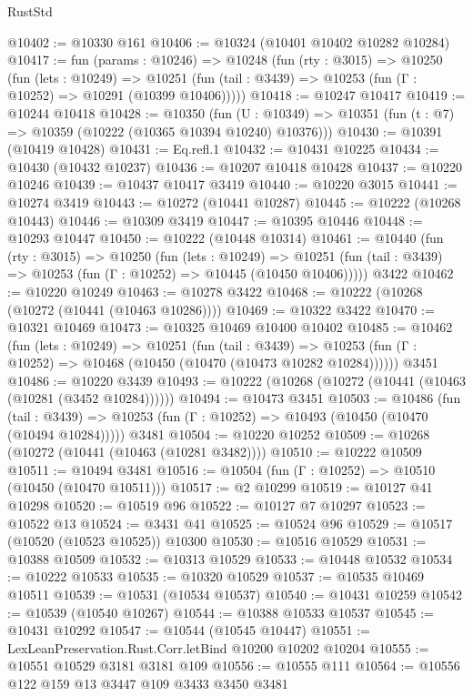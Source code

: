 \begin{lexlean}{RustStd}
\begin{coremodule}
@10402 := @10330 @161
@10406 := @10324 (@10401 @10402 @10282 @10284)
@10417 := fun (params : @10246) =>
  @10248
    (fun (rty : @3015) =>
    @10250
      (fun (lets : @10249) =>
      @10251 (fun (tail : @3439) => @10253 (fun (Γ : @10252) => @10291 (@10399 @10406)))))
@10418 := @10247 @10417
@10419 := @10244 @10418
@10428 := @10350
    (fun (U : @10349) => @10351 (fun (t : @7) => @10359 (@10222 (@10365 @10394 @10240) @10376)))
@10430 := @10391 (@10419 @10428)
@10431 := Eq.refl.{1}
@10432 := @10431 @10225
@10434 := @10430 (@10432 @10237)
@10436 := @10207 @10418 @10428
@10437 := @10220 @10246
@10439 := @10437 @10417 @3419
@10440 := @10220 @3015
@10441 := @10274 @3419
@10443 := @10272 (@10441 @10287)
@10445 := @10222 (@10268 @10443)
@10446 := @10309 @3419
@10447 := @10395 @10446
@10448 := @10293 @10447
@10450 := @10222 (@10448 @10314)
@10461 := @10440
    (fun (rty : @3015) =>
    @10250
      (fun (lets : @10249) =>
      @10251 (fun (tail : @3439) => @10253 (fun (Γ : @10252) => @10445 (@10450 @10406)))))
    @3422
@10462 := @10220 @10249
@10463 := @10278 @3422
@10468 := @10222 (@10268 (@10272 (@10441 (@10463 @10286))))
@10469 := @10322 @3422
@10470 := @10321 @10469
@10473 := @10325 @10469 @10400 @10402
@10485 := @10462
    (fun (lets : @10249) =>
    @10251
      (fun (tail : @3439) =>
      @10253 (fun (Γ : @10252) => @10468 (@10450 (@10470 (@10473 @10282 @10284))))))
    @3451
@10486 := @10220 @3439
@10493 := @10222 (@10268 (@10272 (@10441 (@10463 (@10281 (@3452 @10284))))))
@10494 := @10473 @3451
@10503 := @10486
    (fun (tail : @3439) => @10253 (fun (Γ : @10252) => @10493 (@10450 (@10470 (@10494 @10284)))))
    @3481
@10504 := @10220 @10252
@10509 := @10268 (@10272 (@10441 (@10463 (@10281 @3482))))
@10510 := @10222 @10509
@10511 := @10494 @3481
@10516 := @10504 (fun (Γ : @10252) => @10510 (@10450 (@10470 @10511)))
@10517 := @2 @10299
@10519 := @10127 @41 @10298
@10520 := @10519 @96
@10522 := @10127 @7 @10297
@10523 := @10522 @13
@10524 := @3431 @41
@10525 := @10524 @96
@10529 := @10517 (@10520 (@10523 @10525)) @10300
@10530 := @10516 @10529
@10531 := @10388 @10509
@10532 := @10313 @10529
@10533 := @10448 @10532
@10534 := @10222 @10533
@10535 := @10320 @10529
@10537 := @10535 @10469 @10511
@10539 := @10531 (@10534 @10537)
@10540 := @10431 @10259
@10542 := @10539 (@10540 @10267)
@10544 := @10388 @10533 @10537
@10545 := @10431 @10292
@10547 := @10544 (@10545 @10447)
@10551 := LexLeanPreservation.Rust.Corr.letBind @10200 @10202 @10204
@10555 := @10551 @10529 @3181 @3181 @109
@10556 := @10555 @111
@10564 := @10556 @122 @159 @13 @3447 @109 @3433 @3450 @3481

\end{coremodule}
\end{lexlean}
